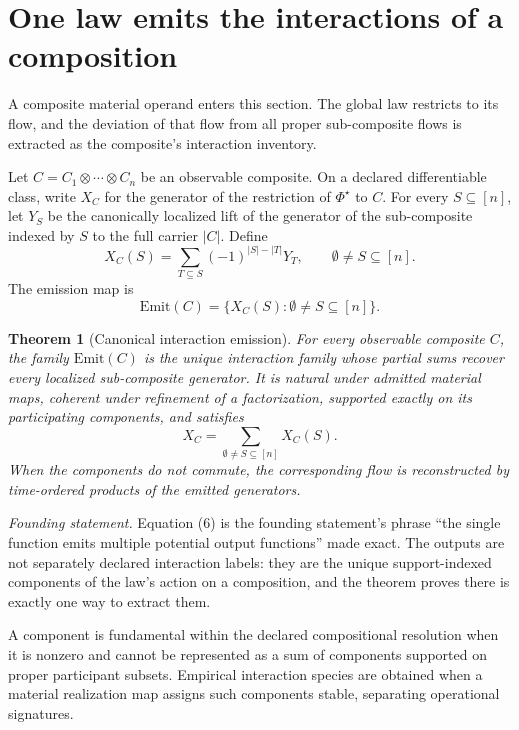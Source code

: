 \documentclass[11pt]{article}
\newtheorem{theorem}{Theorem}
\theoremstyle{definition}
\newcommand{\founding}{\emph{Founding statement.}}
\begin{document}
\section{One law emits the interactions of a composition}

A composite material operand enters this section. The global law restricts to its flow, and the deviation of that flow from all proper sub-composite flows is extracted as the composite's interaction inventory.

Let $C = C_1 \otimes \cdots \otimes C_n$ be an observable composite. On a declared differentiable class, write $X_C$ for the generator of the restriction of $\Phi^{\star}$ to $C$. For every $S \subseteq [n]$, let $Y_S$ be the canonically localized lift of the generator of the sub-composite indexed by $S$ to the full carrier $|C|$. Define
\begin{equation}
X_C(S) = \sum_{T \subseteq S} (-1)^{|S|-|T|} Y_T, \qquad \emptyset \neq S \subseteq [n]. \tag{6}
\end{equation}
The emission map is
\begin{equation}
\mathrm{Emit}(C) = \{X_C(S) : \emptyset \neq S \subseteq [n]\}. \tag{7}
\end{equation}

\begin{theorem}[Canonical interaction emission]
\label{thm:canonical-interaction-emission}
For every observable composite $C$, the family $\mathrm{Emit}(C)$ is the unique interaction family whose partial sums recover every localized sub-composite generator. It is natural under admitted material maps, coherent under refinement of a factorization, supported exactly on its participating components, and satisfies
\begin{equation}
X_C = \sum_{\emptyset \neq S \subseteq [n]} X_C(S). \tag{8}
\end{equation}
When the components do not commute, the corresponding flow is reconstructed by time-ordered products of the emitted generators.
\end{theorem}

\noindent\founding{} Equation (6) is the founding statement's phrase ``the single function emits multiple potential output functions'' made exact. The outputs are not separately declared interaction labels: they are the unique support-indexed components of the law's action on a composition, and the theorem proves there is exactly one way to extract them.

A component is fundamental within the declared compositional resolution when it is nonzero and cannot be represented as a sum of components supported on proper participant subsets. Empirical interaction species are obtained when a material realization map assigns such components stable, separating operational signatures.
\end{document}
